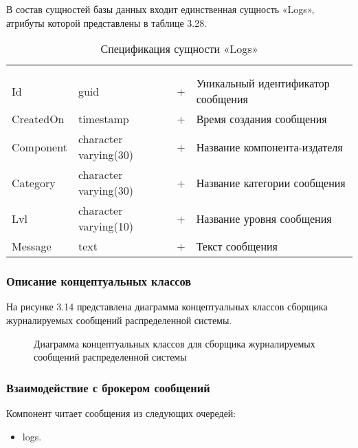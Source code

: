 В состав сущностей базы данных входит единственная сущность «Logs», атрибуты которой представлены в таблице 3.28.

\begin{xltabular}{\textwidth}{|X|X|X|X|}
	\caption{Спецификация сущности «Logs»}\label{logger_log:table}\\ \hline
	 &  &  &  \\ \hline
	 &  &  &  \\ \hline
	\endfirsthead
	 \hline
	 &  &  &  \\ \hline
	\endhead
	Id & guid & + & Уникальный идентификатор сообщения \\ \hline
	CreatedOn & timestamp & + & Время создания сообщения \\ \hline
	Component & character 
	varying(30) & + & Название компонента-издателя \\ \hline
	Category & character 
	varying(30) & + & Название категории сообщения \\ \hline
	Lvl & character 
	varying(10) & + & Название уровня сообщения \\ \hline
	Message & text & + & Текст сообщения \\ \hline
\end{xltabular}

\subsubsection{Описание концептуальных классов}

На рисунке 3.14 представлена диаграмма концептуальных классов сборщика журналируемых сообщений распределенной системы.

\begin{figure}[H]
\caption{Диаграмма концептуальных классов для сборщика журналируемых сообщений распределенной системы}
\label{logger/diagram_classes:image}
\end{figure}

\subsubsection{Взаимодействие с брокером сообщений}

Компонент читает сообщения из следующих очередей:
\begin{itemize}
\item logs.
\end{itemize}

